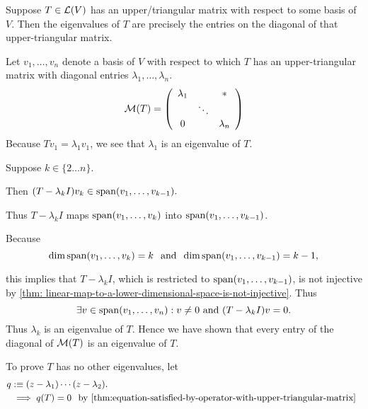 \begin{thm}
  \label{thm:determination-of-eigenvalue-from-upper-triangular-matrix}
  Suppose $T\in \mathcal{L}(V)$ has an upper\-/triangular matrix with respect to some basis of $V$. Then the eigenvalues of $T$ are precisely the entries on the diagonal of that upper-triangular matrix. 
  
\end{thm}
\begin{prf}
  Let $v_1, \ldots, v_n$ denote a basis of $V$ with respect to which $T$ has an upper-triangular matrix with diagonal entries $\lambda_1, \ldots, \lambda_n$.
  \begin{equation}
    \mathcal{M}(T) =
    \left( {\begin{array}{ccc}
        \lambda_1 &         &  * \\
        &  \ddots &    \\
        0      &         & \lambda_n
    \end{array} } \right)
  \end{equation}  
  Because $T v_1 = \lambda_1 v_1$, we see that $\lambda_1$ is an eigenvalue of $T$.
  
  Suppose $k \in \{2 \ldots n\}.$ 
  
  Then $(T-\lambda_k I) v_k \in \operatorname{span} (v_1, \ldots, v_{k-1}).$ 
  
  Thus $T-\lambda_k I$ maps $\operatorname{span} (v_1, \ldots, v_k)$ into $\operatorname{span} (v_1, \ldots, v_{k-1})$.
  
  Because
  \begin{equation}
    \dim \operatorname{span} (v_1, \ldots, v_k) = k \;\;\, \text{and}\;\; \dim \operatorname{span} (v_1, \ldots, v_{k-1}) = k-1,
  \end{equation}
  
  this implies that $T-\lambda_k I$, which is restricted to $\operatorname{span} (v_1, \ldots, v_{k-1})$, is not injective by \autoref{thm: linear-map-to-a-lower-dimensional-space-is-not-injective}. Thus 
  \begin{equation}
    \exists v \in \myspan{v_1, \ldots, v_n}: v\neq0$ and $(T-\lambda_k I)v=0. 
  \end{equation}
  Thus $\lambda_k$ is an eigenvalue of $T$. Hence we have shown that every entry of the diagonal of $\mathcal{M}(T)$ is an eigenvalue of $T$.
  
  To prove $T$ has no other eigenvalues, let
  \begin{equation}
    \begin{aligned}
      q &:\equiv (z-\lambda_1) \cdots (z-\lambda_2). \\
      &\implies q(T) = 0 \mytext{by \autoref{thm:equation-satisfied-by-operator-with-upper-triangular-matrix}}
    \end{aligned}
  \end{equation}
  

\end{prf}

